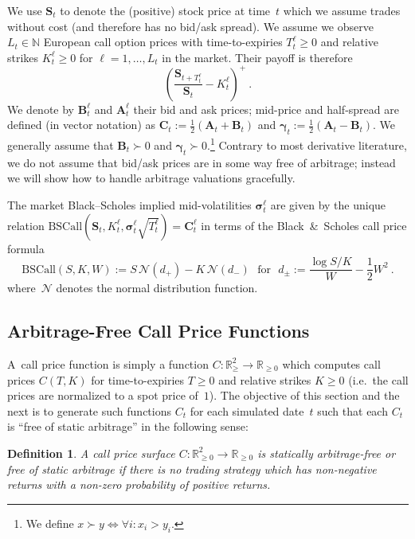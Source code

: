 \documentclass[11pt,a4paper]{article}
\newtheorem{definition}{Definition}[section]
\newcommand{\R}{\mathbb{R}}
\newcommand{\N}{\mathbb{N}}
\newcommand{\BSCall}{\mathrm{BSCall}}
\begin{document}
We use $\bm{S}_t$ to denote the (positive) stock price at time~$t$ which we
assume trades without cost (and therefore has no bid/ask spread).
We assume we observe~$L_t\in\N$ 
European call option prices with time-to-expiries $T_t^\ell \geq 0$ and
relative strikes $K^\ell_t\geq 0$
for $\ell=1,\ldots,L_t$
in the market. Their payoff is therefore
$$
   \left (\frac{\bm{S}_{t+T^\ell_t}}{\bm{S}_t} - K^\ell_t \right)^+ \ .
$$
We denote by $\bm{B}_t^{\ell}$ and $\bm{A}_t^\ell$ their bid and ask prices;
mid-price and half-spread are defined (in vector notation) as
$\bm{C}_t := \tfrac{1}{2}(\bm{A}_t + \bm{B}_t)$ and
$\bm{\gamma}_t := \tfrac{1}{2}(\bm{A}_t - \bm{B}_t)$.
We generally assume that $\bm{B}_t\succ0$ and $\bm{\gamma}_t\succ0$.\footnote{
We define $x \succ y \Leftrightarrow \forall i: x_i > y_i$.} 
Contrary to most derivative literature, we do not assume that bid/ask prices are in some way free of arbitrage; instead
we will show how to handle arbitrage valuations gracefully.


The market Black--Scholes implied mid-volatilities $\bm{\sigma}_t^\ell$ are
given by the unique relation
$\BSCall(\bm{S}_t,K^\ell_t,\bm{\sigma}_t^\ell\sqrt{T^\ell_t} ) = \bm{C}_t^\ell$ in
terms of the Black~\&~Scholes call price formula
\begin{equation}\label{eq:bs}
    \BSCall(S,K,W) := S\,\mathcal{N}( d_+ ) - K\,\mathcal{N}(d_-)
    \ \ \ \mbox{for} \ \ \
    d_\pm := \frac{ \log S/K }{ W } - \frac12 W^2 \ .
\end{equation}
where~$\mathcal{N}$ denotes the normal distribution function.

\subsection{Arbitrage-Free Call Price Functions}

A~call price function is simply a function $C:\R^2_{\geq} \longrightarrow  \R_{\geq 0}$
which computes call prices $C(T,K)$ for time-to-expiries $T\geq 0$ and relative
strikes $K\geq 0$ (i.e.~the call prices are normalized to a spot price of~$1$). 
The objective of this section and the next is to generate such functions $C_t$ for each
simulated date~$t$ such that each $C_t$ is ``free of static arbitrage'' in the following sense:

\begin{definition}
A call price surface $C: \R^2_{\geq 0}\to \R_{\geq 0}$ is \emph{statically
arbitrage-free} or \emph{free of static arbitrage} if there is no trading strategy 
which has non-negative returns with a non-zero probability of
positive returns.    
\end{definition}
\end{document}
